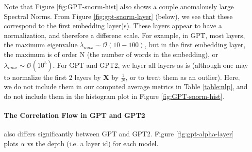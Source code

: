 Note that Figure \ref{fig:GPT-snorm-hist} also shows a couple anomalously  large Spectral Norms.
From Figure \ref{fig:gpt-snorm-layer} (below), we see that these correspond to the first embedding layer(s).
These layers appear to have a normalization, and therefore a differenc scale.
For example, in GPT, most layers, the maximum eigenvalue $\lambda_{max}\sim\mathcal{O}(10-100)$,
but in the first embedding layer, the maximum is of order N (the number of words in the embedding), or
 $\lambda_{max}\sim\mathcal{O}(10^{5})$.  For GPT and GPT2, we layer all layers as-is (although one may to normalize
the first 2 layers by  $\mathbf{X}$ by $\frac{1}{N}$, or to treat them as an outlier).
Here, we do not include them in our computed average metrics in Table \ref{table:nlp},
and do not include them in the histogram plot in Figure \ref{fig:GPT-snorm-hist}.


\paragraph{The Correlation Flow in GPT and GPT2} also differs significantly between GPT and GPT2.
Figure \ref{fig:gpt-alpha-layer} plots $\alpha$ vs the depth (i.e. a layer id) for each model.


